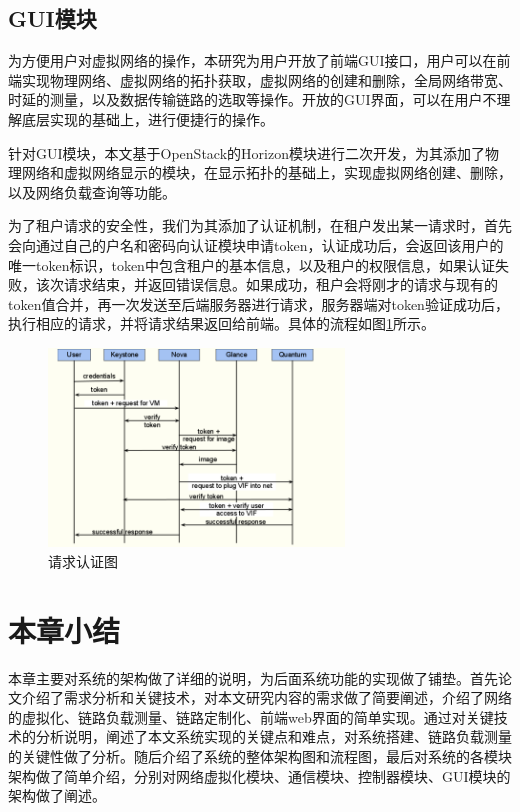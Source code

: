 \subsection{GUI模块}
为方便用户对虚拟网络的操作，本研究为用户开放了前端GUI接口，用户可以在前端实现物理网络、虚拟网络的拓扑获取，虚拟网络的创建和删除，全局网络带宽、时延的测量，以及数据传输链路的选取等操作。开放的GUI界面，可以在用户不理解底层实现的基础上，进行便捷行的操作。

针对GUI模块，本文基于OpenStack的Horizon模块进行二次开发，为其添加了物理网络和虚拟网络显示的模块，在显示拓扑的基础上，实现虚拟网络创建、删除，以及网络负载查询等功能。

为了租户请求的安全性，我们为其添加了认证机制，在租户发出某一请求时，首先会向通过自己的户名和密码向认证模块申请token，认证成功后，会返回该用户的唯一token标识，token中包含租户的基本信息，以及租户的权限信息，如果认证失败，该次请求结束，并返回错误信息。如果成功，租户会将刚才的请求与现有的token值合并，再一次发送至后端服务器进行请求，服务器端对token验证成功后，执行相应的请求，并将请求结果返回给前端。具体的流程如图\ref{fig:credentials}所示。

\begin{figure}[!htb]
  \centering
  \includegraphics[width=0.7\textwidth]{logo/credentials.png}
  \caption{请求认证图}
  \label{fig:credentials}
\end{figure}

\section{本章小结}
本章主要对系统的架构做了详细的说明，为后面系统功能的实现做了铺垫。首先论文介绍了需求分析和关键技术，对本文研究内容的需求做了简要阐述，介绍了网络的虚拟化、链路负载测量、链路定制化、前端web界面的简单实现。通过对关键技术的分析说明，阐述了本文系统实现的关键点和难点，对系统搭建、链路负载测量的关键性做了分析。随后介绍了系统的整体架构图和流程图，最后对系统的各模块架构做了简单介绍，分别对网络虚拟化模块、通信模块、控制器模块、GUI模块的架构做了阐述。